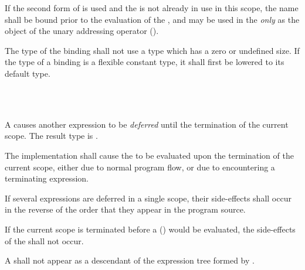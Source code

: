 \specsubsubitem
If the second form of  is used and the 
is not already in use in this scope, the name shall be bound prior to the
evaluation of the , and may be used in the
 \textit{only} as the object of the unary addressing
operator (\terminal{\&}).

\specsubsubitem
The type of the binding shall not use a type which has a zero or undefined size.
If the type of a binding is a flexible constant type, it shall first be lowered
to its default type.


\begin{grammar}
 \\
	  \\
\end{grammar}

\specsubsubitem
A  causes another expression to be
\textit{deferred} until the termination of the current scope. The result type
is .

\specsubsubitem
The implementation shall cause the  to be evaluated
upon the termination of the current scope, either due to normal program flow,
or due to encountering a terminating expression.

\specsubsubitem
If several expressions are deferred in a single scope, their side-effects shall
occur in the reverse of the order that they appear in the program source.

\specsubsubitem
If the current scope is terminated before a 
() would be
evaluated, the side-effects of the  shall not occur.

\specsubsubitem
A  shall not appear as a descendant of the
expression tree formed by .


\begin{grammar}
 \\
	 \terminal{;} \\
	 \terminal{;}  \\

 \\
	 \terminal{\{}  \terminal{\}} \\

\exactly \\
	\terminal{:}  \\
\end{grammar}

